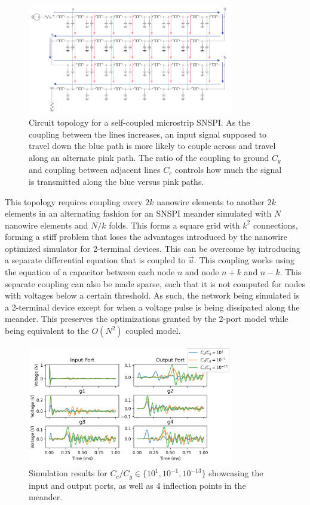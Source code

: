 \begin{figure}
    \centering
    \includegraphics[width=0.8\textwidth]{figs/snspi_coupled.png}
    \caption{Circuit topology for a self-coupled microstrip SNSPI. As the coupling between
    the lines increases, an input signal supposed to travel down the blue path is more 
    likely to couple across and travel along an alternate pink path. The ratio of the coupling to ground $C_g$
    and coupling between adjacent lines $C_c$ controls how much the signal is transmitted along the blue
    versus pink paths.}
    \label{fig:snspi_coupled}
\end{figure}

This topology requires coupling every $2k$ nanowire elements to another $2k$ elements in an alternating 
fashion for an SNSPI meander simulated with $N$ nanowire elements and $N/k$ folds. This forms a square
grid with $k^2$ connections, forming a stiff problem that loses the advantages introduced by the
nanowire optimized simulator for 2-terminal devices. This can be overcome by introducing a separate
differential equation that is coupled to $\vec u$. This coupling works using the equation of a capacitor
between each node $n$ and node $n+k$ and $n-k$. This separate coupling can also be made sparse, such that
it is not computed for nodes with voltages below a certain threshold. As such, the network being simulated
is a 2-terminal device except for when a voltage pulse is being dissipated along the meander.
This preserves the optimizations granted by the 2-port model while being equivalent to the $O(N^2)$
coupled model.

\begin{figure}
    \centering
    \includegraphics[width=0.8\textwidth]{figs/snspi_coupled_data.png}
    \caption{Simulation results for $C_c/C_g\in \{ 10^1, 10^{-1}, 10^{-13}\}$ showcasing
    the input and output ports, as well as 4 inflection points in the meander.}
    \label{fig:snspi_coupled}
\end{figure}


